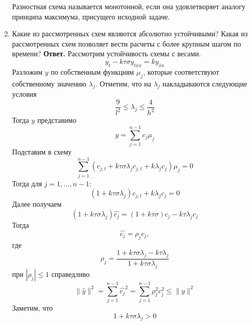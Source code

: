 \documentclass{article}
\begin{document}
\begin{enumerate}
		 Разностная схема называется монотонной, если она удовлетворяет аналогу принципа максимума, присущего
		 исходной задаче.
		\item Какие из рассмотренных схем являются абсолютно устойчивыми? Какая из рассмотренных схем позволяет вести
		расчеты с более крупным шагом по времени?
		\newline 
		{\bfseries Ответ. } 
		Рассмотрим устойчивость схемы с весами. 
		\begin{equation*}
			y_t - k \tau \sigma y_{t\bar{x}x} = k y_{\bar{x}x}
		\end{equation*}
		Разложим $y$ по собственным функциям $\mu_j$, которые соответствуют собственному 
		значению $\lambda_j$.
		Отметим, что на $\lambda_j$ накладываются следующие условия 
		\begin{equation*}
			\frac{9}{l^2} \leqslant \lambda_j \leqslant \frac{4}{h^2}
		\end{equation*}
		Тогда $y$ представимо 
		\begin{equation*}
			y = \sum_{j=1}^{n-1} c_j \mu_j
		\end{equation*}
		Подставим в схему 
		\begin{equation*}
			\sum_{j=1}^{n-1} \left(c_{j,t} + k \tau \sigma \lambda_j c_{j,t} + 
			k \lambda_j c_j \right)\mu_j = 0
		\end{equation*}
		Тогда для $j=1,\ldots, n-1$:
		\begin{equation*}
			(1+k\tau\sigma \lambda_j ) c_{j,t} + k \lambda_j c_j = 0
		\end{equation*}
		Далее получаем 
		\begin{equation*}
			(1 + k \tau \sigma \lambda_j ) \hat{c_j} = (1+k \tau \sigma) c_j - 
			k \tau \lambda_j c_j 
		\end{equation*}
		Тогда 
		\begin{equation*}
			\hat{c_j} = \rho_j c_j,
		\end{equation*}
		где 
		\begin{equation*}
			\rho_j = \frac{1+k \tau \sigma \lambda_j - k \tau \lambda_j}{1+k \tau 
			\sigma \lambda_j}	
		\end{equation*}
		при $|\rho_j| \leqslant 1$ справедливо
		\begin{equation*}
			\|\hat{y}\|^2 = \sum_{j=1}^{n-1} \hat{c_j}^2 = \sum_{j=1}^{n-1} \rho_j^2 c_j^2
			\leqslant \|y\|^2
		\end{equation*}
		Заметим, что 
		\begin{equation*}
			1 + k \tau \sigma \lambda_j > 0
		\end{equation*}

\end{enumerate}
\end{document}
